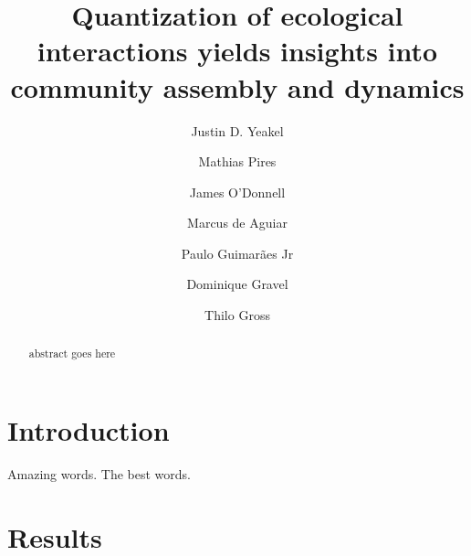 \documentclass[twocolumn,preprintnumbers,amsmath,amssymb,superscriptaddress]{revtex4}
\begin{document}
\author{Justin D. Yeakel} 

\author{Mathias Pires} \affiliation{}

\author{James O'Donnell} \affiliation{}

\author{Marcus de Aguiar} \affiliation{}

\author{Paulo Guimar\~aes Jr} \affiliation{}

\author{Dominique Gravel} \affiliation{}

\author{Thilo Gross} \affiliation{}

\title{Quantization of ecological interactions yields insights into community assembly and dynamics}


\begin{abstract}
abstract goes here
\end{abstract}

\maketitle

\section*{Introduction}

Amazing words. The best words.


\section*{Results}
\end{document}
